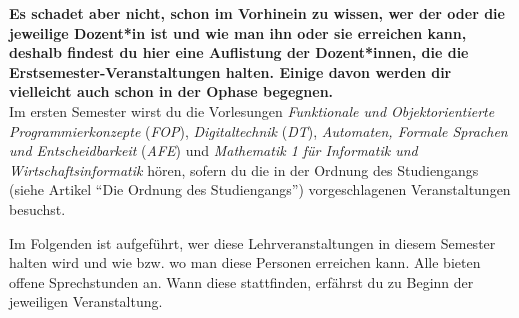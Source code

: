 
\textbf{Es schadet aber nicht, schon im Vorhinein zu wissen, wer der oder die jeweilige Dozent*in ist und wie man ihn oder sie erreichen kann, deshalb findest du hier eine Auflistung der Dozent*innen, die die Erstsemester-Veranstaltungen halten. Einige davon werden dir vielleicht auch schon in der Ophase begegnen.}\\

Im ersten Semester wirst du die Vorlesungen \textit{Funktionale und Objektorientierte Programmierkonzepte} (\textit{FOP}), \textit{Digitaltechnik} (\textit{DT}), \textit{Automaten, Formale Sprachen und Entscheidbarkeit} (\textit{AFE}) und \textit{Mathematik 1 für Informatik und Wirtschaftsinformatik} hören, sofern du die in der Ordnung des Studiengangs (siehe Artikel "`Die Ordnung des Studiengangs"') vorgeschlagenen Veranstaltungen besuchst.

Im Folgenden ist aufgeführt, wer diese Lehrveranstaltungen in diesem Semester halten wird und wie bzw. wo man diese Personen erreichen kann. Alle bieten offene Sprechstunden an. Wann diese stattfinden, erfährst du zu Beginn der jeweiligen Veranstaltung.

